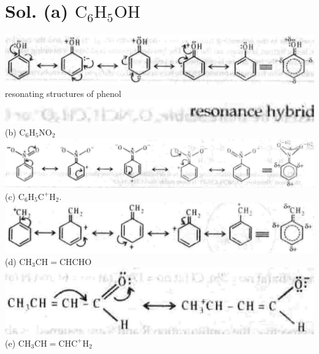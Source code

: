 \documentclass[10pt]{article}
\begin{document}
\section*{Sol. (a) $\mathrm{C}_{6} \mathrm{H}_{5} \mathrm{OH}$}
\includegraphics[max width=\textwidth, center]{2025_01_28_8470952b98110cec3aabg-126(3)}\\
resonating structures of phenol\\
\includegraphics[max width=\textwidth, center]{2025_01_28_8470952b98110cec3aabg-126(7)}\\
(b) $\mathrm{C}_{6} \mathrm{H}_{5} \mathrm{NO}_{2}$\\
\includegraphics[max width=\textwidth, center]{2025_01_28_8470952b98110cec3aabg-126(8)}\\
(c) $\mathrm{C}_{6} \mathrm{H}_{5} \mathrm{C}^{+} \mathrm{H}_{2}$.\\
\includegraphics[max width=\textwidth, center]{2025_01_28_8470952b98110cec3aabg-126(4)}\\
(d) $\mathrm{CH}_{3} \mathrm{CH}=\mathrm{CHCHO}$\\
\includegraphics[max width=\textwidth, center]{2025_01_28_8470952b98110cec3aabg-126}\\
(e) $\mathrm{CH}_{3} \mathrm{CH}=\mathrm{CHC}^{+} \mathrm{H}_{2}$\\
\end{document}
